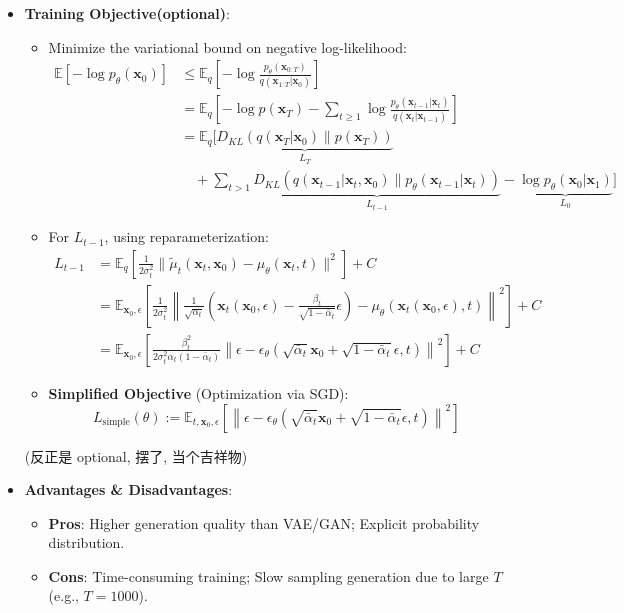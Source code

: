 \documentclass[UTF8]{ctexart}
\begin{document}
\begin{itemize}
    \newpage
    \item \textbf{Training Objective(optional)}:
    \begin{itemize}
        \item Minimize the variational bound on negative log-likelihood:
        \begin{align*}
        \mathbb{E}[-\log p_\theta(\mathbf{x}_0)] 
        &\le \mathbb{E}_q \left[ -\log \frac{p_\theta(\mathbf{x}_{0:T})}{q(\mathbf{x}_{1:T}|\mathbf{x}_0)} \right] \\
        &= \mathbb{E}_q \left[ -\log p(\mathbf{x}_T) - \sum_{t\ge 1} \log \frac{p_\theta(\mathbf{x}_{t-1}|\mathbf{x}_t)}{q(\mathbf{x}_t|\mathbf{x}_{t-1})} \right] \\
        &= \mathbb{E}_q \Big[ \underbrace{D_{KL}(q(\mathbf{x}_T|\mathbf{x}_0) \| p(\mathbf{x}_T))}_{L_T} \\
        &\quad + \sum_{t>1} \underbrace{D_{KL}(q(\mathbf{x}_{t-1}|\mathbf{x}_t, \mathbf{x}_0) \| p_\theta(\mathbf{x}_{t-1}|\mathbf{x}_t))}_{L_{t-1}} - \underbrace{\log p_\theta(\mathbf{x}_0|\mathbf{x}_1)}_{L_0} \Big]
        \end{align*}
        \item For $L_{t-1}$, using reparameterization:
        \begin{align*}
        L_{t-1} 
        &= \mathbb{E}_q \left[ \frac{1}{2\sigma_t^2} \| \tilde{\mu}_t(\mathbf{x}_t, \mathbf{x}_0) - \mu_\theta(\mathbf{x}_t, t) \|^2 \right] + C \\
        &= \mathbb{E}_{\mathbf{x}_0, \epsilon} \left[ \frac{1}{2\sigma_t^2} \left\| \frac{1}{\sqrt{\alpha_t}} \left( \mathbf{x}_t(\mathbf{x}_0, \epsilon) - \frac{\beta_t}{\sqrt{1-\bar{\alpha}_t}}\epsilon \right) - \mu_\theta(\mathbf{x}_t(\mathbf{x}_0, \epsilon), t) \right\|^2 \right] + C \\
        &= \mathbb{E}_{\mathbf{x}_0, \epsilon} \left[ \frac{\beta_t^2}{2\sigma_t^2\alpha_t(1-\bar{\alpha}_t)} \left\| \epsilon - \epsilon_\theta \left( \sqrt{\bar{\alpha}_t}\mathbf{x}_0 + \sqrt{1-\bar{\alpha}_t}\epsilon, t \right) \right\|^2 \right] + C
        \end{align*}
        \item \textbf{Simplified Objective} (Optimization via SGD):
        $$L_{\text{simple}}(\theta) := \mathbb{E}_{t, \mathbf{x}_0, \epsilon} \left[ \left\| \epsilon - \epsilon_\theta \left( \sqrt{\bar{\alpha}_t}\mathbf{x}_0 + \sqrt{1-\bar{\alpha}_t}\epsilon, t \right) \right\|^2 \right]$$
    \end{itemize}
    (反正是 optional, 摆了, 当个吉祥物)

    \item \textbf{Advantages \& Disadvantages}:
    \begin{itemize}
        \item \textbf{Pros}: Higher generation quality than VAE/GAN; Explicit probability distribution.
        \item \textbf{Cons}: Time-consuming training; Slow sampling generation due to large $T$ (e.g., $T=1000$).
    \end{itemize}

\end{itemize}
\end{document}
